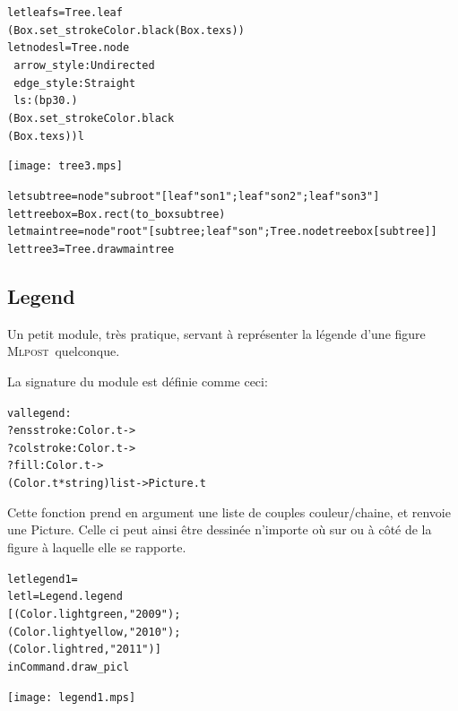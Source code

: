 \documentclass[a4paper,12pt]{article}
\newcommand{\mlpost}{\textsc{Mlpost}}
\begin{document}
\bigskip

\begin{minipage}{0.5\linewidth}
  \begin{alltt}
    let leaf s = Tree.leaf 
    (Box.set_stroke Color.black (Box.tex s))
    let node s l = Tree.node  
    ~arrow_style:Undirected 
    ~edge_style:Straight 
    ~ls:(bp 30.)
    (Box.set_stroke Color.black 
    (Box.tex s)) l
  \end{alltt}
\end{minipage}
\begin{minipage}{0.5\linewidth}
  \begin{center}
    \texttt{[image: tree3.mps]}
  \end{center}
\end{minipage}

\bigskip

\begin{alltt}
  let subtree = node "subroot" [leaf "son1"; leaf "son2"; leaf "son3"]
  let treebox = Box.rect (to_box subtree)
  let maintree = node "root" [subtree; leaf "son"; Tree.node treebox [subtree]]
  let tree3 = Tree.draw maintree 
\end{alltt}

\subsection{Legend}
Un petit module, très pratique, servant à représenter la légende d'une figure \mlpost\ quelconque.

La signature du module est définie comme ceci:
\begin{alltt}
  val legend : 
  ?ensstroke:Color.t ->
  ?colstroke:Color.t ->
  ?fill:Color.t ->
  (Color.t * string) list -> Picture.t
\end{alltt}

Cette fonction prend en argument une liste de couples couleur/chaine, et renvoie une Picture. Celle ci peut ainsi être dessinée n'importe où sur ou à côté de la figure à laquelle elle se rapporte.

\bigskip

\begin{minipage}{0.5\linewidth}
  \begin{alltt}
    let legend1 = 
    let l = Legend.legend
    [(Color.lightgreen,"2009");
      (Color.lightyellow,"2010");
      (Color.lightred,"2011")]
    in Command.draw_pic l
  \end{alltt}
\end{minipage}
\begin{minipage}{0.5\linewidth}
  \begin{center}
    \texttt{[image: legend1.mps]}
  \end{center}
\end{minipage}
\end{document}
